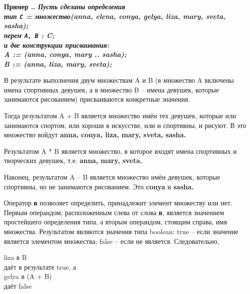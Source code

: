 \documentclass[10pt]{report}
\newcounter{exam}[section]
\renewcommand{\theexam}{\thesection.\arabic{exam}}
\newenvironment{Example}{\par\refstepcounter{exam}\bf Пример \theexam. \sl}{\rm\par}
\begin{document}
\begin{Example}
\textit{Пусть сделаны определения}\\
\rm 	
\hspace*{5mm} \textbf{тип} \texttt{C} = множество(anna, elena, conya, gelya, liza, mary, sveta, sasha);\\
\hspace*{5mm} \textbf{перем} \texttt{A, B} : C;\\

\textit{и две конструкции присваивания:}\\
\hspace*{5mm} A := (anna, conya, mary .. sasha); \\
\hspace*{5mm} B := (anna, liza, mary, sveta); \\
\end{Example}
В результате выполнения двум множествам A и B (в множество A включены имена спортивных девушек, а в множество B -- имена девушек, которые занимаются рисованием) присваиваются конкретные значения.

Тогда результатом A + B является множество имён тех девушек, которые или занимаются спортом, или хороши в искусстве, или и спортивны, и рисуют. В это множество войдут \textbf{anna, conya, liza, mary, sveta, sasha.}

Результатом A * B является множество, в которое входят имена спортивных и творческих девушек, т.е. \textbf{anna, mary, sveta.}

Наконец, результатом A -- B является множество имён девушек, которые спортивны, но не занимаются рисованием. Это \textbf{conya} и \textbf{sasha.}

Оператор \textbf{в} позволяет определить, принадлежит элемент множеству или нет. Первым операндом, расположенным слева от слова \textbf{в}, является значением простейшего определения типа, а вторым операндом, стоящим справа, имя множества. Результатом являются значения типа boolean: true -- если значение является элементом множества; false -- если не является.
Следовательно,
\begin{flushleft}
\hspace*{5mm} liza в B \\
\hspace*{5mm} даёт в результате true, а \\
\hspace*{5mm} gelya в (A + B) \\
\hspace*{5mm} даёт false \\
\end{flushleft}
\end{document}
